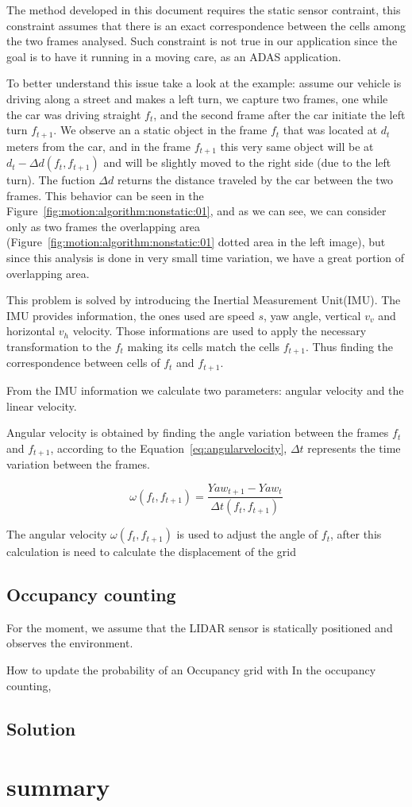 The method developed in this document requires the static sensor contraint, this constraint assumes that there is an exact correspondence between the cells among the two frames analysed. Such constraint is not true in our application since the goal is to have it running in a moving care, as an ADAS application. 

To better understand this issue take a look at the example: assume our vehicle is driving along a street and makes a left turn, we capture two frames, one while the car was driving straight $f_t$, and the second frame  after the car initiate the left turn $f_{t+1}$. We observe an a static object in the frame $f_t$ that was located at $d_t$ meters from the car, and in the frame $f_{t+1}$ this very same object will be at $d_t-\Delta d(f_t,f_{t+1})$ and will be slightly moved to the right side (due to the left turn). The fuction $\Delta d$ returns the distance traveled by the car between the two frames. This behavior can be seen in the Figure~\ref{fig:motion:algorithm:nonstatic:01}, and as we can see, we can consider only as two frames the overlapping area (Figure~\ref{fig:motion:algorithm:nonstatic:01} dotted area in the left image), but since this analysis is done in very small time variation, we have a great portion of overlapping area.

This problem is solved by introducing the Inertial Measurement Unit(IMU). The IMU provides information, the ones used are speed $s$, yaw angle, vertical $v_v$ and horizontal $v_h$ velocity. Those informations are used to apply the necessary transformation to the $f_t$ making its cells match the cells $f_{t+1}$. Thus finding the correspondence between cells of $f_t$ and $f_{t+1}$.

From the IMU information we calculate two parameters: angular velocity and the linear velocity. 

Angular velocity is obtained by finding the angle variation between the frames $f_t$ and $f_{t+1}$, according to the Equation~\ref{eq:angularvelocity}, $\Delta t$ represents the time variation between the frames.

\begin{equation}
\label{eq:angularvelocity}
\omega(f_t,f_{t+1}) = \frac{Yaw_{t+1}-Yaw_t}{\Delta t(f_t,f_{t+1})} 
\end{equation} 

The angular velocity $\omega(f_t,f_{t+1})$ is used to adjust the angle of $f_t$, after this calculation is need to calculate the displacement of the grid

\subsection{Occupancy counting}

For the moment, we assume that the LIDAR sensor is statically positioned and observes the environment.

How to update the probability of an Occupancy grid with 
In the occupancy counting, 


\subsection{Solution}


\section{summary}

